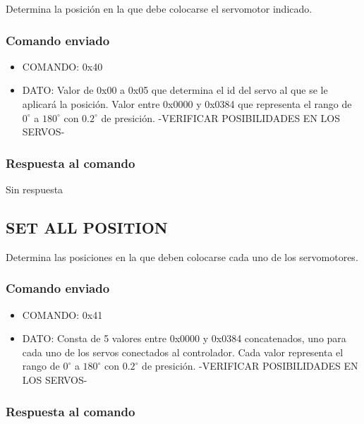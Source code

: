 \documentclass[a4paper,11pt]{article}
\begin{document}
Determina la posici\'on en la que debe colocarse el servomotor indicado.

\subsubsection*{Comando enviado}
\label{set_position_comando_enviado}

\begin{itemize}
	\item{COMANDO:} 0x40
	\item{DATO:} Valor de 0x00 a 0x05 que determina el id del servo al que se le aplicar\'a la posici\'on.
	Valor entre 0x0000 y 0x0384 que representa el rango de $0^{\circ}$ a $180^{\circ}$ con $0.2^{\circ}$ de presici\'on. -VERIFICAR POSIBILIDADES EN LOS SERVOS-
\end{itemize}

\subsubsection*{Respuesta al comando}
\label{set_position_respuesta}

Sin respuesta

\subsection{SET ALL POSITION}
\label{set_all_position}

Determina las posiciones en la que deben colocarse cada uno de los servomotores.

\subsubsection*{Comando enviado}
\label{set_all_position_comando_enviado}

\begin{itemize}
	\item{COMANDO:} 0x41
	\item{DATO:} Consta de 5 valores entre 0x0000 y 0x0384 concatenados, uno para cada uno de los servos conectados al controlador.
	Cada valor representa el rango de $0^{\circ}$ a $180^{\circ}$ con $0.2^{\circ}$ de presici\'on. -VERIFICAR POSIBILIDADES EN LOS SERVOS-
\end{itemize}

\subsubsection*{Respuesta al comando}
\label{set_all_position_respuesta}
\end{document}
